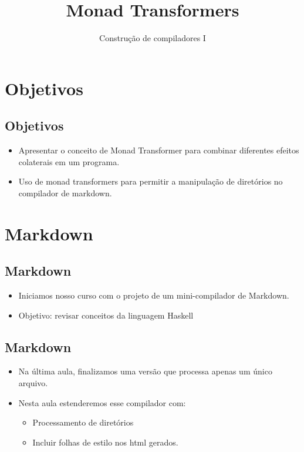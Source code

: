 \documentclass[11pt]{article}
\author{Construção de compiladores I}
\date{}
\title{Monad Transformers}
\begin{document}
\maketitle
\section*{Objetivos}
\label{sec:org1bfeb9d}

\subsection*{Objetivos}
\label{sec:orgfca5cda}

\begin{itemize}
\item Apresentar o conceito de Monad Transformer para combinar diferentes
efeitos colaterais em um programa.

\item Uso de monad transformers para permitir a manipulação de diretórios no
compilador de markdown.
\end{itemize}
\section*{Markdown}
\label{sec:orgb96e407}

\subsection*{Markdown}
\label{sec:org6270bc1}

\begin{itemize}
\item Iniciamos nosso curso com o projeto de um mini-compilador de Markdown.

\item Objetivo: revisar conceitos da linguagem Haskell
\end{itemize}
\subsection*{Markdown}
\label{sec:org6efbc94}

\begin{itemize}
\item Na última aula, finalizamos uma versão que processa apenas um único arquivo.

\item Nesta aula estenderemos esse compilador com:
\begin{itemize}
\item Processamento de diretórios
\item Incluir folhas de estilo nos html gerados.
\end{itemize}
\end{itemize}
\end{document}
